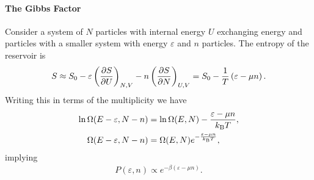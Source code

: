 \paragraph{The Gibbs Factor}
Consider a system of $N$ particles with internal energy $U$ exchanging energy and particles with a smaller system with energy $\varepsilon$ and $n$ particles. The entropy of the reservoir is
\begin{align*}
	S \approx S_{0} - \varepsilon\left(\pdv{S}{U}\right)_{N, V} - n\left(\pdv{S}{N}\right)_{U, V} = S_{0} - \frac{1}{T}\left(\varepsilon - \mu n\right).
\end{align*}
Writing this in terms of the multiplicity we have
\begin{align*}
	\ln{\Omega(E - \varepsilon, N - n)} &= \ln{\Omega(E, N)} - \frac{\varepsilon - \mu n}{k_{\text{B}} T}, \\
	\Omega(E - \varepsilon, N - n)      &= \Omega(E, N)e^{-\frac{\varepsilon - \mu n}{k_{\text{B}} T}},
\end{align*}
implying
\begin{align*}
	P(\varepsilon, n) \propto e^{-\beta\left(\varepsilon - \mu n\right)}.
\end{align*}